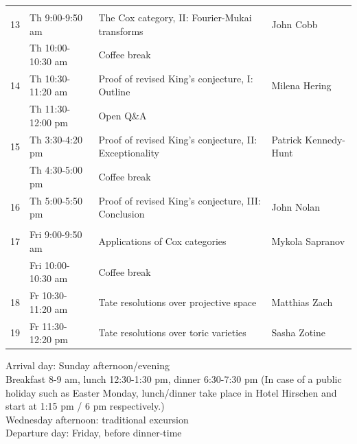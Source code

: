 \documentclass[10pt,a4paper]{article}
\begin{document}
\begin{tabular}{llll}
&&&\\
13 & Th 9:00-9:50 am & The Cox category, II: Fourier-Mukai transforms & John Cobb \\
  & Th  10:00-10:30 am & Coffee break &  \\
14 & Th 10:30-11:20 am & Proof of revised King's conjecture, I: Outline  & Milena Hering \\
&Th 11:30-12:00 pm& Open Q\&A\\
15 & Th 3:30-4:20 pm  &   Proof of revised King's conjecture, II: Exceptionality & Patrick Kennedy-Hunt \\
  & Th  4:30-5:00 pm & Coffee break &  \\
16 & Th 5:00-5:50 pm & Proof of revised King's conjecture, III: Conclusion & John Nolan \\
&&&\\
17 & Fri 9:00-9:50 am & Applications of Cox categories & Mykola Sapranov \\
& Fri 10:00-10:30 am & Coffee break\\
18 & Fr 10:30-11:20 am & Tate resolutions over projective space & Matthias Zach \\
19 & Fr 11:30-12:20 pm & Tate resolutions over toric varieties & Sasha Zotine
\end{tabular}

\vspace{1cm} \noindent
Arrival day: Sunday afternoon/evening \\
Breakfast 8-9 am, lunch 12:30-1:30 pm, dinner 6:30-7:30 pm 
(In case of a public holiday such as Easter Monday, lunch/dinner take place in Hotel Hirschen and start at 1:15 pm / 6 pm respectively.) \\
Wednesday afternoon: traditional excursion \\
Departure day: Friday, before dinner-time
\end{document}
